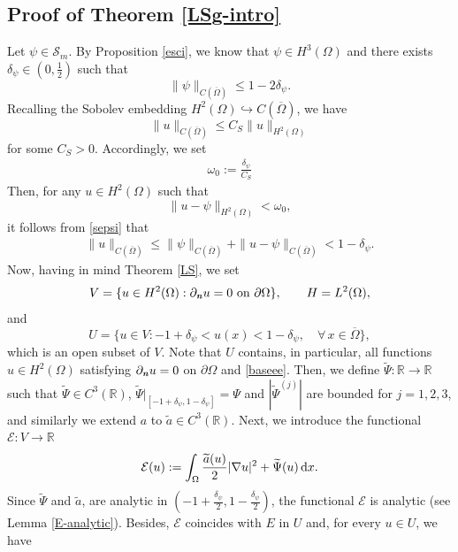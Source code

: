 \documentclass[11pt,reqno]{amsart}
\theoremstyle{remark}
\def\n{\textbf{\textit{n}}}
\def\R{\mathbb{R}}
\def\d{{\rm d}}
\numberwithin{equation}{section}
\def\d{{\rm d}}
\begin{document}
\subsection{Proof of Theorem \ref{LSg-intro}}
Let $\psi\in \mathcal{S}_m$. By Proposition \ref{esci}, we know that $\psi\in H^3(\Omega)$ and there exists $\delta_{\psi}\in \left(0,\frac12\right)$ such that
\begin{equation}
\label{sepsi}
\|\psi\|_{C(\overline{\Omega})} \leq 1-2\delta_\psi.
\end{equation}
Recalling the Sobolev embedding $H^2(\Omega)\hookrightarrow C(\overline{\Omega})$, we have
\begin{equation*}
\|u\|_{C(\overline{\Omega})}\leq C_S \|u\|_{H^2(\Omega)}
\end{equation*}
for some $C_S>0$. Accordingly, we set
 \begin{align*}
\omega_0:=\frac{\delta_\psi}{C_S}\label{vicino}
\end{align*}
Then, for any $u\in H^2(\Omega)$ such that
\begin{equation}
\label{baseee}\|u-\psi\|_{H^2(\Omega)}<\omega_0,
\end{equation}
it follows from \eqref{sepsi} that
\begin{align*}
\|u\|_{C(\overline{\Omega})}
\leq \|\psi\|_{C(\overline{\Omega})}
+\|u-\psi\|_{C(\overline{\Omega})}
< 1-\delta_\psi.
\end{align*}
Now, having in mind Theorem \ref{LS}, we set
$$
V=\{u\in H^2(\Omega):\partial_\n u=0\text{ on }\partial\Omega\},\qquad H=L^2(\Omega),$$
and
$$
U=\{u\in V:-1+\delta_\psi<u(x)<1-\delta_\psi,\quad \forall \, x\in \overline{\Omega}\},
$$
which is an open subset of $V$. Note that $U$ contains, in particular, all functions $u\in H^2(\Omega)$ satisfying  $\partial_\n u=0$ on $\partial \Omega$ and \eqref{baseee}.
Then, we define $\widetilde{\Psi}: \mathbb{R} \to \mathbb{R}$ such that $\widetilde{\Psi} \in C^3(\mathbb{R})$, $\widetilde{\Psi}|_{[-1+\delta_\psi,1-\delta_\psi]}=\Psi$ and $|\widetilde{\Psi}^{(j)}|$ are bounded for $j=1,2,3$, and similarly we extend $a$ to $\widetilde{a}\in C^3(\R)$. Next,
we introduce the functional $\mathcal{E}:V\to\R$
\begin{equation}
\label{ene-LS}
\mathcal{E}(u):= \int_{\Omega} \frac{\widetilde{a}(u)}{2}|\nabla u|^2 +\widetilde{\Psi}(u) \, \d x.
\end{equation}
Since $\widetilde{\Psi}$ and $\widetilde{a}$, are analytic in $(-1+\frac{\delta_\psi}{2},1-\frac{\delta_\psi}{2})$, the functional $\mathcal{E}$ is
analytic (see Lemma \ref{E-analytic}). Besides, $\mathcal{E}$ coincides with $E$ in $U$ and, for every $u\in U$, we have
\end{document}
